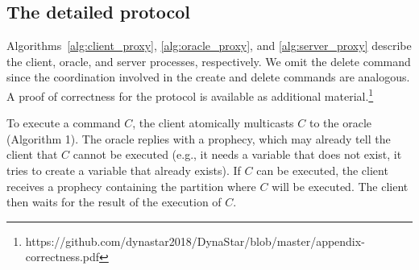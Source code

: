 \subsection{The detailed protocol}
\label{sec:detailed}

Algorithms~\ref{alg:client_proxy}, \ref{alg:oracle_proxy}, and \ref{alg:server_proxy} describe the client, oracle, and server processes, respectively. 
We omit the delete command since the coordination involved in the create and delete commands are analogous. 
A proof of correctness for the protocol is available as additional material.\footnote{https://github.com/dynastar2018/DynaStar/blob/master/appendix-correctness.pdf}



To execute a command $C$, the client atomically multicasts $C$ to the oracle (Algorithm 1).
The oracle replies with a prophecy, which may already tell the client that $C$ cannot be executed (e.g., it needs a variable that does not exist, it tries to create a variable that already exists).
If $C$ can be executed, the client receives a prophecy containing the partition where $C$ will be executed. The client then waits for the result of the execution of $C$.





